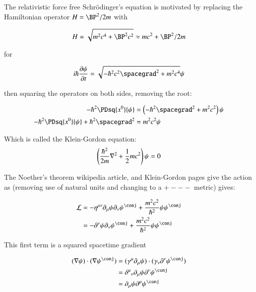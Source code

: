 The relativistic force free Schr\"{o}dinger's equation is motivated by \cite{srednicki2007qft} replacing the Hamiltonian operator $H = \BP^2/{2 m}$ with

\begin{align*}
H = \sqrt{m^2 c^4 + \BP^2 c^2} \approx m c^2 + \BP^2/2m
\end{align*}

for

\begin{align*}
i \hbar \PD{t}{\psi} = \sqrt{ -\hbar^2 c^2 \spacegrad^2 + m^2 c^4} \psi
\end{align*}

then squaring the operators on both sides, removing the root:

\begin{align*}
- \hbar^2 \PDsq{x^0}{\psi} &= \left(-\hbar^2 \spacegrad^2 + m^2 c^2 \right) \psi \\
- \hbar^2 \PDsq{x^0}{\psi} + \hbar^2 \spacegrad^2 &= m^2 c^2 \psi \\
\end{align*}

Which is called the Klein-Gordon equation:
\begin{align*}
\left(\frac{\hbar^2}{2m} \nabla^2 + \frac{1}{2} m c^2\right) \psi = 0 \\
\end{align*}

The Noether's theorem wikipedia article, and Klein-Gordon pages give the action
as (removing use of natural units and changing to a $+---$ metric) gives:

\begin{align*}
\LL &= -\eta^{\mu\nu} \partial_\mu \psi \partial_\nu \psi^\conj + \frac{m^2 c^2}{\hbar^2} \psi \psi^\conj \\
&= -\partial^\nu \psi \partial_\nu \psi^\conj + \frac{m^2 c^2}{\hbar^2} \psi \psi^\conj \\
\end{align*}

This first term is a squared spacetime gradient

\begin{align*}
(\grad \psi) \cdot (\grad \psi^\conj) 
&= (\gamma^\mu \partial_\mu \psi) \cdot (\gamma_\nu \partial^\nu \psi^\conj) \\
&= {\delta^\mu}_\nu \partial_\mu \psi \partial^\nu \psi^\conj \\
&= \partial_\mu \psi \partial^\mu \psi^\conj \\
\end{align*}

